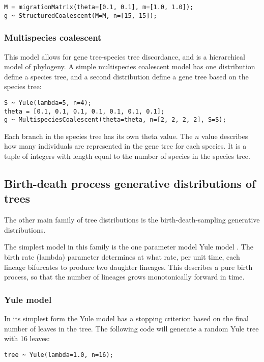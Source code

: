 \documentclass[oneside]{article}
\begin{document}
\begin{verbatim}
M = migrationMatrix(theta=[0.1, 0.1], m=[1.0, 1.0]);
g ~ StructuredCoalescent(M=M, n=[15, 15]);
\end{verbatim}

\subsubsection{Multispecies coalescent}

This model allows for gene tree-species tree discordance, and is a
hierarchical model of phylogeny.
A simple multispecies coalescent model has one distribution define a
species tree, and a second distribution define a gene tree based on
the species tree:

\begin{verbatim}
S ~ Yule(lambda=5, n=4);
theta = [0.1, 0.1, 0.1, 0.1, 0.1, 0.1, 0.1];
g ~ MultispeciesCoalescent(theta=theta, n=[2, 2, 2, 2], S=S);
\end{verbatim}

Each branch in the species tree has its own theta value.
The $n$ value describes how many individuals are represented in
the gene tree for each species.
It is a tuple of integers with length equal to the number of species
in the species tree.

\subsection{Birth-death process generative distributions of trees}

The other main family of tree distributions is the birth-death-sampling generative distributions.

The simplest model in this family is the one parameter model Yule model \cite{yule1925ii}.
The birth rate (lambda) parameter determines at what rate, per unit time, each lineage bifurcates to produce two daughter lineages.
This describes a pure birth process, so that the number of lineages grows monotonically forward in time.

\subsubsection{Yule model}

In its simplest form the Yule model has a stopping criterion based on the final number of leaves in the tree.
The following code will generate a random Yule tree with 16 leaves:

\begin{verbatim}
tree ~ Yule(lambda=1.0, n=16);
\end{verbatim}
\end{document}
